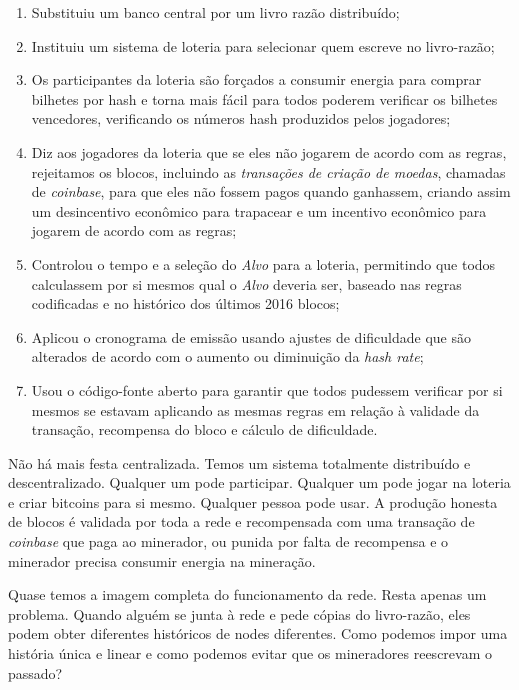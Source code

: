 \begin{enumerate}
\item Substituiu um banco central por um livro razão distribuído;
\item Instituiu um sistema de loteria para selecionar quem escreve no livro-razão;
\item Os participantes da loteria são forçados a consumir energia para comprar bilhetes por hash e torna mais fácil para todos poderem verificar os bilhetes vencedores, verificando os números hash produzidos pelos jogadores;
\item Diz aos jogadores da loteria que se eles não jogarem de acordo com as regras, rejeitamos os blocos, incluindo as \textit{transações de criação de moedas}, chamadas de \textit{coinbase}, para que eles não fossem pagos quando ganhassem, criando assim um desincentivo econômico para trapacear e um incentivo econômico para jogarem de acordo com as regras;
\item Controlou o tempo e a seleção do \textit{Alvo} para a loteria, permitindo que todos calculassem por si mesmos qual o \textit{Alvo} deveria ser, baseado nas regras codificadas e no histórico dos últimos 2016 blocos;
\item Aplicou o cronograma de emissão usando ajustes de dificuldade que são alterados de acordo com o aumento ou diminuição da \textit{hash rate};
\item Usou o código-fonte aberto para garantir que todos pudessem verificar por si mesmos se estavam aplicando as mesmas regras em relação à validade da transação, recompensa do bloco e cálculo de dificuldade.
\end{enumerate}

Não há mais festa centralizada. Temos um sistema totalmente distribuído e descentralizado. Qualquer um pode participar. Qualquer um pode jogar na loteria e criar bitcoins para si mesmo. Qualquer pessoa pode usar. A produção honesta de blocos é validada por toda a rede e recompensada com uma transação de \textit{coinbase} que paga ao minerador, ou punida por falta de recompensa e o minerador precisa consumir energia na mineração.

Quase temos a imagem completa do funcionamento da rede. Resta apenas um problema. Quando alguém se junta à rede e pede cópias do livro-razão, eles podem obter diferentes históricos de nodes diferentes. Como podemos impor uma história única e linear e como podemos evitar que os mineradores reescrevam o passado?